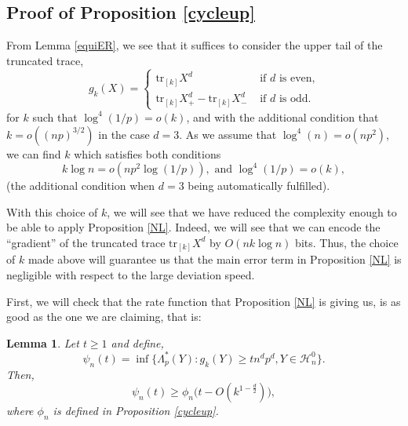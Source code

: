 \documentclass[aop,preprint]{imsart}
\newcommand\tr{\mathrm{tr}}
\numberwithin{equation}{section}
\theoremstyle{definition}
\theoremstyle{plain}
\newtheorem{Lem}[Def]{Lemma}
\theoremstyle{remark}
\begin{document}
\subsection{Proof of Proposition \ref{cycleup}}
From Lemma \ref{equiER}, we see that it suffices to consider the upper tail of the truncated trace,
$$g_k(X) = \begin{cases}
\tr_{[k]} X^d & \text{ if  $d$ is even,}\\
\tr_{[k]} X_+^d - \tr_{[k]} X_-^d & \text{ if  $d$ is odd.}
\end{cases}$$ 
for $k$ such that $ \log^4(1/p) = o(k)$, and with the additional condition that $k=o((np)^{3/2})$ in the case $d=3$. As we assume that $  \log^4(n) = o(np^2)$,
we can find $k$ which satisfies both conditions 
\begin{equation} \label{condk} k\log n =o(np^2 \log(1/p)), \text{ and }\log^4(1/p) = o(k),\end{equation} (the additional condition when $d=3$ being automatically fulfilled). 

With this choice of $k$, we will see that we have reduced the complexity enough to be able to apply Proposition \ref{NL}. Indeed, we will see that we can encode the ``gradient'' of the truncated trace $\tr_{[k]} X^d$ by $O(nk\log n )$ bits. Thus, the choice of $k$ made above will guarantee us that the main error term in Proposition \ref{NL} is negligible with respect to the large deviation speed.

First, we will check that the rate function that Proposition \ref{NL} is giving us, is as good as the one we are claiming, that is:

\begin{Lem}\label{psiphi}
Let $t\geq 1$ and define,
$$\psi_{n}(t) = \inf \big\{ \Lambda_p^*(Y) : g_k( Y) \geq t n^d p^d, Y \in \mathcal{H}_n^0 \big\}.$$
Then,   
$$ \psi_{n}(t) \geq  \phi_n\Big( t-O(k^{1-\frac{d}{2}})\Big),$$
where $\phi_n$ is defined in Proposition \ref{cycleup}.
\end{Lem}
\end{document}
